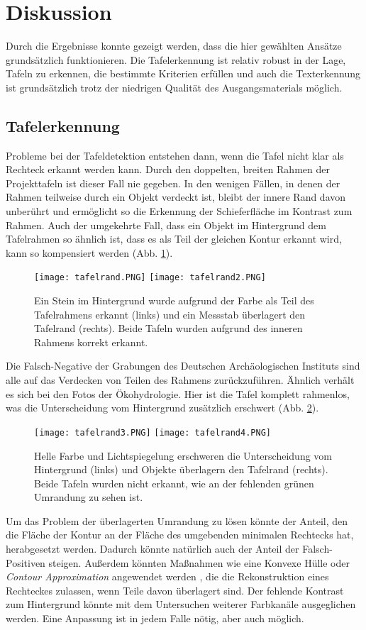 \section{Diskussion}

Durch die Ergebnisse konnte gezeigt werden, dass die hier gewählten Ansätze grundsätzlich funktionieren. Die Tafelerkennung ist relativ robust in der Lage, Tafeln zu erkennen, die bestimmte Kriterien erfüllen und auch die Texterkennung ist grundsätzlich trotz der niedrigen Qualität des Ausgangsmaterials möglich.
\subsection{Tafelerkennung}
Probleme bei der Tafeldetektion entstehen dann, wenn die Tafel nicht klar als Rechteck erkannt werden kann. Durch den doppelten, breiten Rahmen der Projekttafeln ist dieser Fall nie gegeben. In den wenigen Fällen, in denen der Rahmen teilweise durch ein Objekt verdeckt ist, bleibt der innere Rand davon unberührt und ermöglicht so die Erkennung der Schieferfläche im Kontrast zum Rahmen. Auch der umgekehrte Fall, dass ein Objekt im Hintergrund dem Tafelrahmen so ähnlich ist, dass es als Teil der gleichen Kontur erkannt wird, kann so kompensiert werden (Abb. \ref{fig:tafelrand}).
\begin{figure}[h!]
\texttt{[image: tafelrand.PNG]}
\texttt{[image: tafelrand2.PNG]}
\caption{Ein Stein im Hintergrund wurde aufgrund der Farbe als Teil des Tafelrahmens erkannt (links) und ein Messstab überlagert den Tafelrand (rechts). Beide Tafeln wurden aufgrund des inneren Rahmens korrekt erkannt.}
\label{fig:tafelrand}
\end{figure}
Die Falsch-Negative der Grabungen des Deutschen Archäologischen Instituts sind alle auf das Verdecken von Teilen des Rahmens zurückzuführen. Ähnlich verhält es sich bei den Fotos der Ökohydrologie. Hier ist die Tafel komplett rahmenlos, was die Unterscheidung vom Hintergrund zusätzlich erschwert (Abb. \ref{fig:tafelrand2}).
\begin{figure}[h!]
\texttt{[image: tafelrand3.PNG]}
\texttt{[image: tafelrand4.PNG]}
\caption{Helle Farbe und Lichtspiegelung erschweren die Unterscheidung vom Hintergrund (links) und Objekte überlagern den Tafelrand (rechts). Beide Tafeln wurden nicht erkannt, wie an der fehlenden grünen Umrandung zu sehen ist.}
\label{fig:tafelrand2}
\end{figure}
Um das Problem der überlagerten Umrandung zu lösen könnte der Anteil, den die Fläche der Kontur an der Fläche des umgebenden minimalen Rechtecks hat, herabgesetzt werden. Dadurch könnte natürlich auch der Anteil der Falsch-Positiven steigen. Außerdem könnten Maßnahmen wie eine Konvexe Hülle oder \textit{Contour Approximation} angewendet werden  \cite{opencvcontours}, die die Rekonstruktion eines Rechteckes zulassen, wenn Teile davon überlagert sind. Der fehlende Kontrast zum Hintergrund könnte mit dem Untersuchen weiterer Farbkanäle ausgeglichen werden. Eine Anpassung ist in jedem Falle nötig, aber auch möglich.
